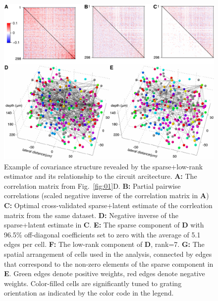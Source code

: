 \begin{figure}[htp]
\centering
\includegraphics{figures/Reconstruction.pdf}
\caption{
Example of covariance structure revealed by the sparse+low-rank estimator and its relationship to the circuit arcitecture.
{\bf A:} The correlation matrix from Fig.~\ref{fig:01}D. 
{\bf B:} Partial pairwise correlations (scaled negative inverse of the correlation matrix in {\bf A}) 
{\bf C:} Optimal cross-validated sparse+latent estimate of the corrleation matrix from the same dataset. 
{\bf D:} Negative inverse of the sparse+latent estimate in {\bf C}. 
{\bf E:} The sparse component of {\bf D} with 96.5\% off-diagonal coefficients set to zero with the average of 5.1 edges per cell.
{\bf F:} The low-rank component of {\bf D}, rank=7.
{\bf G:} The spatial arrangement of cells used in the analysis, connected by edges that correspond to the non-zero elements of the sparse component in {\bf E}. Green edges denote positive weights, red edges denote negative weights.  Color-filled cells are significantly tuned to grating orientation as indicated by the color code in the legend.
}
\label{fig:05}
\end{figure}

